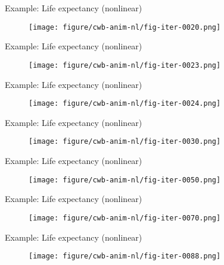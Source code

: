 \begin{frame}{Example: Life expectancy (nonlinear)}
	\begin{figure}
		\centering
		\texttt{[image: figure/cwb-anim-nl/fig-iter-0020.png]}
	\end{figure}
	\addtocounter{framenumber}{-1}
\end{frame}


\begin{frame}{Example: Life expectancy (nonlinear)}
	\begin{figure}
		\centering
		\texttt{[image: figure/cwb-anim-nl/fig-iter-0023.png]}
	\end{figure}
	\addtocounter{framenumber}{-1}
\end{frame}


\begin{frame}{Example: Life expectancy (nonlinear)}
	\begin{figure}
		\centering
		\texttt{[image: figure/cwb-anim-nl/fig-iter-0024.png]}
	\end{figure}
	\addtocounter{framenumber}{-1}
\end{frame}


\begin{frame}{Example: Life expectancy (nonlinear)}
	\begin{figure}
		\centering
		\texttt{[image: figure/cwb-anim-nl/fig-iter-0030.png]}
	\end{figure}
	\addtocounter{framenumber}{-1}
\end{frame}


\begin{frame}{Example: Life expectancy (nonlinear)}
	\begin{figure}
		\centering
		\texttt{[image: figure/cwb-anim-nl/fig-iter-0050.png]}
	\end{figure}
	\addtocounter{framenumber}{-1}
\end{frame}


\begin{frame}{Example: Life expectancy (nonlinear)}
	\begin{figure}
		\centering
		\texttt{[image: figure/cwb-anim-nl/fig-iter-0070.png]}
	\end{figure}
	\addtocounter{framenumber}{-1}
\end{frame}


\begin{frame}{Example: Life expectancy (nonlinear)}
	\begin{figure}
		\centering
		\texttt{[image: figure/cwb-anim-nl/fig-iter-0088.png]}
	\end{figure}
	\addtocounter{framenumber}{-1}
\end{frame}


